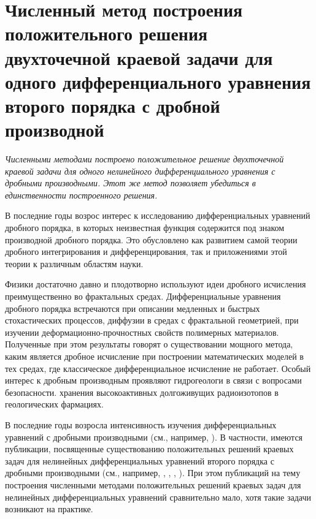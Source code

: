 \section{Численный метод построения положительного решения двухточечной краевой задачи для одного дифференциального уравнения второго порядка с дробной производной}


\textit{Численными методами построено положительное решение двухточечной краевой задачи для одного нелинейного дифференциального уравнения с дробными производными. Этот же метод позволяет убедиться в единственности построенного решения.}

В последние годы возрос интерес к исследованию дифференциальных уравнений дробного порядка, в которых неизвестная функция содержится под знаком производной дробного порядка. Это обусловлено как развитием самой теории дробного интегрирования и дифференцирования, так и приложениями этой теории к различным областям науки.

Физики достаточно давно и плодотворно используют идеи дробного исчисления преимущественно во фрактальных средах. Дифференциальные уравнения дробного порядка встречаются при описании медленных и быстрых стохастических процессов, диффузии в средах с фрактальной геометрией, при изучении деформационно-прочностных свойств полимерных материалов. Полученные при этом результаты говорят о существовании мощного метода, каким является дробное исчисление при построении математических моделей в тех средах, где классическое дифференциальное исчисление не работает. Особый интерес к дробным производным проявляют гидрогеологи в связи с вопросами безопасности. хранения высокоактивных долгоживущих радиоизотопов в геологических фармациях.

В последние годы возросла интенсивность изучения дифференциальных уравнений с дробными производными (см., например, \cite{bailu,wangwang,zhangS,qiubai,caballero,changnieto,shangSQ,beyb,beybShab,aleroev}). В частности, имеются публикации, посвященные существованию положительных решений краевых задач для нелинейных дифференциальных уравнений второго порядка с дробными производными (см., например, \cite{bailu,wangwang}, \cite{qiubai,caballero,changnieto}, \cite{beyb}, \cite{beybDavud}). При этом публикаций на тему построения численными методами положительных решений краевых задач для нелинейных дифференциальных уравнений сравнительно мало, хотя такие задачи возникают на практике.


